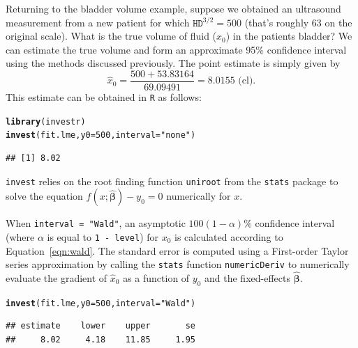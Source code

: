 \documentclass{article}\usepackage[]{graphicx}\usepackage[]{color}
\makeatletter
\newcommand{\hlnum}[1]{\textcolor[rgb]{0.686,0.059,0.569}{#1}}%
\newcommand{\hlstr}[1]{\textcolor[rgb]{0.192,0.494,0.8}{#1}}%
\newcommand{\hlstd}[1]{\textcolor[rgb]{0.345,0.345,0.345}{#1}}%
\newcommand{\hlkwc}[1]{\textcolor[rgb]{0.333,0.667,0.333}{#1}}%
\newcommand{\hlkwd}[1]{\textcolor[rgb]{0.737,0.353,0.396}{\textbf{#1}}}%
\newenvironment{kframe}{%
 \def\at@end@of@kframe{}%
 \ifinner\ifhmode%
  \def\at@end@of@kframe{\end{minipage}}%
  \begin{minipage}{\columnwidth}%
 \fi\fi%
 \def\FrameCommand##1{\hskip\@totalleftmargin \hskip-\fboxsep
 \colorbox{shadecolor}{##1}\hskip-\fboxsep
     \hskip-\linewidth \hskip-\@totalleftmargin \hskip\columnwidth}%
 \MakeFramed {\advance\hsize-\width
   \@totalleftmargin\z@ \linewidth\hsize
   \@setminipage}}%
 {\par\unskip\endMakeFramed%
 \at@end@of@kframe}
\newenvironment{knitrout}{}{} %
\makeatother
\begin{document}
Returning to the bladder volume example, suppose we obtained an ultrasound measurement from a new patient for which $\texttt{HD}^{3/2} = 500$ (that's roughly 63 on the original scale).  What is the true volume of fluid ($x_0$) in the patients bladder?  We can estimate the true volume and form an approximate 95\% confidence interval using the methods discussed previously.  The point estimate is simply given by
\[
  \widehat{x}_0 = \frac{500 + 53.83164}{69.09491} = 8.0155 \text{ (cl)}.
\]
This estimate can be obtained in \texttt{R} as follows:
\begin{knitrout}
\color{fgcolor}\begin{kframe}
\begin{alltt}
\hlkwd{library}\hlstd{(investr)}
\hlkwd{invest}\hlstd{(fit.lme,} \hlkwc{y0} \hlstd{=} \hlnum{500}\hlstd{,} \hlkwc{interval} \hlstd{=} \hlstr{"none"}\hlstd{)}
\end{alltt}
\begin{verbatim}
## [1] 8.02
\end{verbatim}
\end{kframe}
\end{knitrout}
\texttt{invest} relies on the root finding function \texttt{uniroot} from the \texttt{stats} package to solve the equation $f\left(x; \widehat{\bm{\beta}}\right) - y_0 = 0$ numerically for $x$.  

When \texttt{interval = "Wald"}, an asymptotic $100(1-\alpha)\%$ confidence interval (where $\alpha$ is equal to \texttt{1 - level}) for $x_0$ is calculated according to Equation~\eqref{eqn:wald}. The standard error is computed using a First-order Taylor series approximation by calling the \texttt{stats} function \texttt{numericDeriv} to numerically evaluate the gradient of $\widehat{x}_0$ as a function of $y_0$ and the fixed-effects $\widehat{\bm{\beta}}$.
\begin{knitrout}
\color{fgcolor}\begin{kframe}
\begin{alltt}
\hlkwd{invest}\hlstd{(fit.lme,} \hlkwc{y0} \hlstd{=} \hlnum{500}\hlstd{,} \hlkwc{interval} \hlstd{=} \hlstr{"Wald"}\hlstd{)}
\end{alltt}
\begin{verbatim}
## estimate    lower    upper       se 
##     8.02     4.18    11.85     1.95
\end{verbatim}
\end{kframe}
\end{knitrout}
\end{document}
